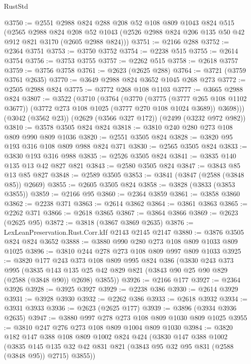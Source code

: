 \begin{lexlean}{RustStd}
\begin{coremodule}
@3750 := @2551
    @2988
    @824
    @288
    @208
    @52
    @108
    @809
    @1043
    @824
    @515
    (@2565
      @2988
      @824
      @208
      @52
      @1043
      (@2526 @2988 @824 @206 @135 @50 @42 @912 @821 @3170 (@2605 @2988 @824)))
@3751 := @2166 @288
@3752 := @2364 @3751
@3753 := @3750 @3752
@3754 := @2238 @515
@3755 := @2614 @3754
@3756 := @3753 @3755
@3757 := @2262 @515
@3758 := @2618 @3757
@3759 := @3756 @3758
@3761 := @2623 (@2625 @288)
@3764 := @3721 (@3759 @3761 @2635)
@3770 := @3649 @2988 @824 @3652 @1045 @268 @273
@3772 := @2505 @2988 @824
@3775 := @3772 @268 @108 @1103
@3777 := @3665 @2988 @824
@3807 := @3522
    (@3710
      (@3764
        (@3770
          (@3775 (@3777 @265 @108 @1102 @3677))
          (@3772 @273 @108 @1025 (@3777 @270 @108 @1024 @3689))
          @3698)))
    (@3042 (@3562 @23))
    (@2629 (@3566 @327 @172))
    (@2499 (@3232 @972 @982))
@3810 := @3578 @3505 @824 @824
@3818 := @3810 @240 @280 @273 @108 @809 @990 @809 @1036
@3820 := @2551 @3505 @824
@3828 := @3820 @95 @193 @316 @108 @809 @988 @824 @371
@3830 := @2565 @3505 @824
@3833 := @3830 @193 @316 @988
@3835 := @2526 @3505 @824
@3841 := @3835 @140 @135 @13 @42 @827 @821
@3843 := @2580 @3505 @824
@3847 := @3843 @85 @13 @85 @827
@3848 := @2589 @3505
@3853 := @3841 (@3847 (@2588 (@3848 @85)) @2669)
@3855 := @2605 @3505 @824
@3858 := @3828 (@3833 (@3853 @3855))
@3859 := @2166 @95
@3860 := @2364 @3859
@3861 := @3858 @3860
@3862 := @2238 @371
@3863 := @2614 @3862
@3864 := @3861 @3863
@3865 := @2262 @371
@3866 := @2618 @3865
@3867 := @3864 @3866
@3869 := @2623 (@2625 @95)
@3872 := @3818 (@3867 @3869 @2635)
@3876 := LexLeanPreservation.Rust.Corr.kIf @2143 @2145 @2147
@3880 := @3876 @3505 @824 @824 @3652
@3888 := @3880 @990 @280 @273 @108 @809 @1033 @809 @1025
@3896 := @3810 @244 @278 @273 @108 @809 @997 @809 @1033
@3925 := @3820
    @177
    @243
    @373
    @108
    @809
    @995
    @824
    @386
    (@3830
      @243
      @373
      @995
      (@3835 @143 @135 @25 @42 @829 @821 (@3843 @90 @25 @90 @829 (@2588 (@3848 @90)) @2698) @3855))
@3926 := @2166 @177
@3927 := @2364 @3926
@3928 := @3925 @3927
@3929 := @2238 @386
@3930 := @2614 @3929
@3931 := @3928 @3930
@3932 := @2262 @386
@3933 := @2618 @3932
@3934 := @3931 @3933
@3936 := @2623 (@2625 @177)
@3939 := @3896 (@3934 @3936 @2635)
@3947 := @3880 @997 @278 @273 @108 @809 @1030 @809 @1025
@3955 := @3810 @247 @276 @273 @108 @809 @1004 @809 @1030
@3984 := @3820
    @182
    @147
    @388
    @108
    @809
    @1002
    @824
    @424
    (@3830
      @147
      @388
      @1002
      (@3835 @145 @135 @32 @42 @831 @821 (@3843 @95 @32 @95 @831 (@2588 (@3848 @95)) @2715) @3855))

\end{coremodule}
\end{lexlean}
